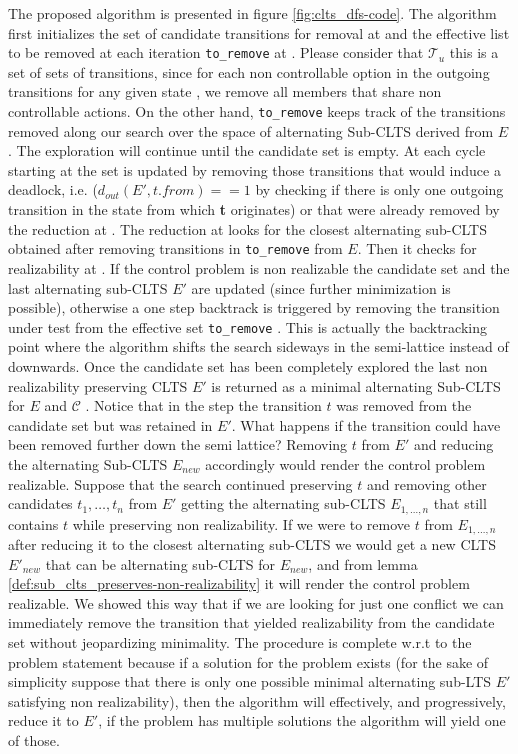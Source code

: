 The proposed algorithm is
presented in figure \ref{fig:clts_dfs-code}. The algorithm first initializes the set of 
candidate transitions
for removal at  and the effective list
to be removed at each iteration \texttt{to\_remove} at
. Please consider that $\mathcal{T}_u$ this is a set of sets of transitions, since for each non controllable option in the outgoing transitions for any given state , we remove all members that share non controllable actions. On the other hand, \texttt{to\_remove} keeps track of the transitions
removed along our search over the space of
alternating Sub-CLTS derived from $E$.  The exploration
will continue until the candidate set is empty.
At each cycle starting at  the set is updated by 
removing those transitions that would induce a deadlock,  i.e. 
($d_{out}(E', t.from) == 1$ by checking if there is only one
outgoing transition in the state from which \textbf{t} originates) or that were already removed by the reduction
at .
The reduction at  looks for the closest
alternating sub-CLTS obtained after removing 
transitions in \texttt{to\_remove} from $E$.
Then it checks for realizability at .  If the control problem is non
realizable the candidate set and the last 
alternating sub-CLTS $E'$ are updated (since further minimization is 
possible), otherwise a one step backtrack
is triggered by removing the transition under test from
the effective set \texttt{to\_remove} .
This is actually the backtracking point where the algorithm
shifts the search sideways in the semi-lattice instead of downwards.
Once the candidate set has been completely explored
the last non realizability preserving CLTS $E'$ is
returned as a minimal alternating Sub-CLTS
for $E$ and $\mathcal{C}$ .
Notice that
in the step  the transition $t$ was removed
from the candidate set but was retained in $E'$.  What happens if
the transition could have been removed further down the semi lattice?  Removing $t$ from $E'$ and reducing the alternating Sub-CLTS 
$E_{new}$ accordingly would render the control problem realizable.  Suppose that
the search continued preserving $t$ and removing other candidates
$t_1, \ldots, t_n$ from $E'$ getting the alternating sub-CLTS
$E_{1,\ldots,n}$ that still contains $t$ while preserving non realizability.
If we were to remove $t$ from $E_{1,\ldots,n}$ after reducing it
to the closest alternating sub-CLTS we would get a new CLTS
$E'_{new}$ that can be alternating sub-CLTS for $E_{new}$, and from lemma
\ref{def:sub_clts_preserves-non-realizability} it will render the control problem
realizable.  We showed this way that if we are looking for just one
conflict we can immediately remove the transition that yielded realizability 
from the candidate set without jeopardizing minimality.
%
The procedure is complete w.r.t to the problem statement because
if a solution for the problem exists (for the sake of simplicity
suppose that there is only one possible minimal alternating sub-LTS $E'$
satisfying non realizability), then the algorithm will effectively, and progressively,
reduce it to $E'$, if the problem has multiple solutions the
algorithm will yield one of those.

